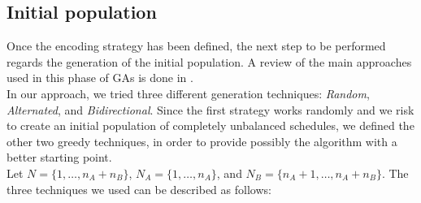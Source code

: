 \documentclass[opre,nonblindrev]{informs3} %
\begin{document}
\subsection{Initial population}
Once the encoding strategy has been defined, the next step to be performed regards the generation of the initial population. A review of the main approaches used in this phase of GAs is done in \cite{init1}.\\
In our approach, we tried three different generation techniques: \textit{Random}, \textit{Alternated}, and \textit{Bidirectional}. Since the first strategy works randomly and we risk to create an initial population of completely unbalanced schedules, we defined the other two greedy techniques, in order to provide possibly the algorithm with a better starting point.\\
Let $N = \{1,\ldots,n_A+n_B\}$, $N_A =\{1,\ldots,n_A\}$, and $N_B=\{n_A+1,\ldots,n_A+n_B\}$. The three techniques we used can be described as follows:
\end{document}
